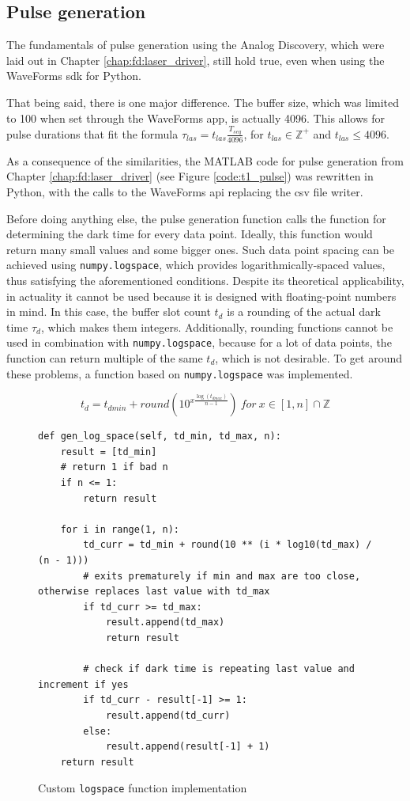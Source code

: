 \subsection{Pulse generation}
The fundamentals of pulse generation using the Analog Discovery, which were laid out in Chapter \ref{chap:fd:laser_driver}, still hold true, even when using the WaveForms \gls{sdk} for Python.

That being said, there is one major difference. The buffer size, which was limited to 100 when set through the WaveForms app, is actually 4096. This allows for pulse durations that fit the formula $\tau_{las} = t_{las}\frac{T_{seq}}{4096}$, for $t_{las} \in \mathbb{Z}^+$ and $t_{las} \leq 4096$.

As a consequence of the similarities, the MATLAB code for pulse generation from Chapter \ref{chap:fd:laser_driver} (see Figure \ref{code:t1_pulse}) was rewritten in Python, with the calls to the WaveForms \gls{api} replacing the \gls{csv} file writer. 

Before doing anything else, the pulse generation function calls the function for determining the dark time for every data point. Ideally, this function would return many small values and some bigger ones. Such data point spacing can be achieved using \lstinline|numpy.logspace|, which provides logarithmically-spaced values, thus satisfying the aforementioned conditions. Despite its theoretical applicability, in actuality it cannot be used because it is designed with floating-point numbers in mind. In this case, the buffer slot count $t_d$ is a rounding of the actual dark time $\tau_d$, which makes them integers. Additionally, rounding functions cannot be used in combination with \lstinline|numpy.logspace|, because for a lot of data points, the function can return multiple of the same $t_d$, which is not desirable. To get around these problems, a function based on \lstinline|numpy.logspace| was implemented. 

\begin{equation}\label{eq:logpspace_custom}
	t_{d} = t_{dmin} + round(10^{x\frac{\log(t_{dmax})}{n - 1}})\ for\ x \in [1,n]\cap \mathbb{Z}
\end{equation}

\begin{figure}[ht]
	\begin{lstlisting}[language=pythe]
def gen_log_space(self, td_min, td_max, n):
	result = [td_min]
	# return 1 if bad n
	if n <= 1:
		return result
		
	for i in range(1, n):
		td_curr = td_min + round(10 ** (i * log10(td_max) / (n - 1)))
		# exits prematurely if min and max are too close, otherwise replaces last value with td_max
		if td_curr >= td_max:
			result.append(td_max)
			return result
		
		# check if dark time is repeating last value and increment if yes
		if td_curr - result[-1] >= 1:
			result.append(td_curr)
		else:
			result.append(result[-1] + 1)
	return result
	\end{lstlisting}
	\caption{Custom \lstinline|logspace| function implementation}
	\label{fig:td:logspace_gen_func}
\end{figure}


